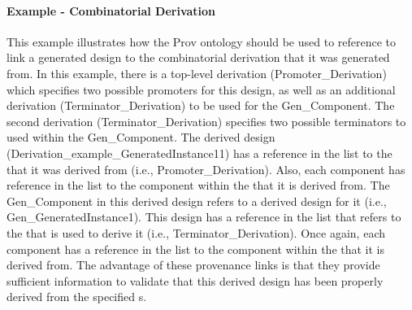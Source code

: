   \paragraph{Example - Combinatorial Derivation}
  This example illustrates how the Prov ontology should be used to reference to link a generated design to the combinatorial derivation that it was generated from.  In this example, there is a top-level derivation (Promoter\_Derivation) which specifies two possible promoters for this design, as well as an additional derivation (Terminator\_Derivation) to be used for the Gen\_Component.  The second derivation (Terminator\_Derivation) specifies two possible terminators to used within the Gen\_Component.  The derived design (Derivation\_example\_GeneratedInstance11) has a reference in the  list to the  that it was derived from (i.e., Promoter\_Derivation).  Also, each component has reference in the  list to the component within the  that it is derived from.  The Gen\_Component in this derived design refers to a derived design for it (i.e., Gen\_GeneratedInstance1).  This design has a reference in the  list that refers to the  that is used to derive it (i.e., Terminator\_Derivation).  Once again, each component has a reference in the  list to the component within the  that it is derived from.  The advantage of these provenance links is that they provide sufficient information to validate that this derived design has been properly derived from the specified s.


